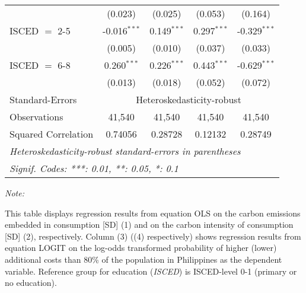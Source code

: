 \begin{table}[htbp!]
\begin{adjustbox}{width = 1\textwidth, max height = 0.95\textheight, center}
\begin{threeparttable}[b]
\begin{tabular}{lcccc}
                                 & (0.023)            & (0.025)            & (0.053)        & (0.164)\\   
            ISCED $=$ 2-5        & -0.016$^{***}$     & 0.149$^{***}$      & 0.297$^{***}$  & -0.329$^{***}$\\   
                                 & (0.005)            & (0.010)            & (0.037)        & (0.033)\\   
            ISCED $=$ 6-8        & 0.260$^{***}$      & 0.226$^{***}$      & 0.443$^{***}$  & -0.629$^{***}$\\   
                                 & (0.013)            & (0.018)            & (0.052)        & (0.072)\\   
            \midrule 
            Standard-Errors & \multicolumn{4}{c}{Heteroskedasticity-robust} \\ 
            Observations         & 41,540             & 41,540             & 41,540         & 41,540\\  
            Squared Correlation  & 0.74056            & 0.28728            & 0.12132        & 0.28749\\  
            \midrule \midrule
            \multicolumn{5}{l}{\emph{Heteroskedasticity-robust standard-errors in parentheses}}\\
            \multicolumn{5}{l}{\emph{Signif. Codes: ***: 0.01, **: 0.05, *: 0.1}}\\
         \end{tabular}
         
         \begin{tablenotes}\item \medskip \textit{Note:}
            \item This table displays regression results from equation OLS on the carbon emissions embedded in consumption [SD] (1) and on the carbon intensity of consumption [SD] (2), respectively. 
                                      Column (3) ((4) respectively) shows regression results from equation LOGIT on the log-odds transformed probability of higher (lower) additional costs than 80\% of the population in Philippines as the dependent variable. Reference group for education (\textit{ISCED}) is ISCED-level 0-1 (primary or no education).
         \end{tablenotes}
      \end{threeparttable}
   \end{adjustbox}
\end{table}


